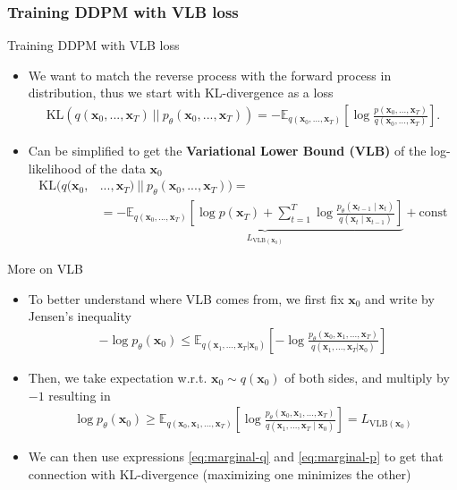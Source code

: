 \documentclass{beamer}
\begin{document}
\subsubsection{Training DDPM with VLB loss}
\begin{frame}{Training DDPM with VLB loss}
\begin{itemize}
  \item We want to match the reverse process with the forward process in distribution, thus we start with KL-divergence as a loss 
  \begin{align*}
    \text{KL}(q(\mathbf{x}_0, ..., \mathbf{x}_T) \ || \ p_\theta(\mathbf{x}_0, ..., \mathbf{x}_T)) = -\mathbb{E}_{q(\mathbf{x}_0, ..., \mathbf{x}_T)}\left[\log \frac{p(\mathbf{x}_0, ..., \mathbf{x}_T)}{q(\mathbf{x}_0, ..., \mathbf{x}_T)}\right].
  \end{align*}
  \item Can be simplified to get the \textbf{Variational Lower Bound (VLB)} of the log-likelihood of the data $\mathbf{x}_0$
  \begin{align*}
    \text{KL}(q(\mathbf{x}_0, &..., \mathbf{x}_T) \ || \ p_\theta(\mathbf{x}_0, ..., \mathbf{x}_T)) = \\
    &= -\underbrace{\mathbb{E}_{q(\mathbf{x}_0, ..., \mathbf{x}_T)}\left[\log p(\mathbf{x}_T) + \sum_{t=1}^{T}{\log \frac{p_\theta(\mathbf{x}_{t-1} \mid \mathbf{x}_t)}{q(\mathbf{x}_t \mid \mathbf{x}_{t-1})}}\right]}_{L_{\text{VLB}(\mathbf{x}_0)}} + \text{const}
  \end{align*}
\end{itemize}
\end{frame}

\begin{frame}{More on VLB}
\begin{itemize}
  \item To better understand where VLB comes from, we first fix $\mathbf{x}_0$ and write by Jensen's inequality 
\begin{align}
-\log p_\theta(\mathbf{x}_0) \leq \mathbb{E}_{q(\mathbf{x}_1,...,\mathbf{x}_T  | \mathbf{x}_0)}\left[-\log \frac{p_\theta(\mathbf{x}_0, \mathbf{x}_1, ..., \mathbf{x}_T)}{q(\mathbf{x}_1,...,\mathbf{x}_T  | \mathbf{x}_0)}\right]
\end{align}
\item Then, we take expectation w.r.t. $\mathbf{x}_0 \sim q(\mathbf{x}_0)$ of both sides, and multiply by $-1$ resulting in 
\begin{align*}
\log p_\theta(\mathbf{x}_0) \geq  \mathbb{E}_{q(\mathbf{x}_0, \mathbf{x}_1,...,\mathbf{x}_T)}\left[\log \frac{p_\theta(\mathbf{x}_0, \mathbf{x}_1, ..., \mathbf{x}_T)}{q(\mathbf{x}_1,...,\mathbf{x}_T \mid \mathbf{x}_0)}\right] = L_{\text{VLB}(\mathbf{x}_0)}
\end{align*}
\item We can then use expressions \eqref{eq:marginal-q} and \eqref{eq:marginal-p} to get that connection with KL-divergence (maximizing one minimizes the other)
\end{itemize}
\end{frame}
\end{document}
